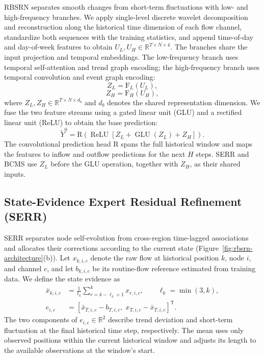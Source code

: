 RBSRN separates smooth changes from short-term fluctuations with low- and high-frequency branches. We apply single-level discrete wavelet decomposition and reconstruction along the historical time dimension of each flow channel, standardize both sequences with the training statistics, and append time-of-day and day-of-week features to obtain \(U_L,U_H\in\mathbb{R}^{T\times N\times4}\). The branches share the input projection and temporal embeddings. The low-frequency branch uses temporal self-attention and trend graph encoding; the high-frequency branch uses temporal convolution and event graph encoding:
\begin{equation}
\label{eq:low-frequency}
Z_L=\mathrm{F}_L(U_L),
\end{equation}
\begin{equation}
\label{eq:high-frequency}
Z_H=\mathrm{F}_H(U_H),
\end{equation}
where \(Z_L,Z_H\in\mathbb{R}^{T\times N\times d_b}\) and \(d_b\) denotes the shared representation dimension. We fuse the two feature streams using a gated linear unit (GLU) and a rectified linear unit (ReLU) to obtain the base prediction:
\begin{equation}
\label{eq:base-prediction}
\widetilde{Y}^{0}=\mathrm{R}\!\left(\operatorname{ReLU}\!\left[Z_L+\operatorname{GLU}(Z_L)+Z_H\right]\right).
\end{equation}
The convolutional prediction head \(\mathrm{R}\) spans the full historical window and maps the features to inflow and outflow predictions for the next \(H\) steps. SERR and BCMS use \(Z_L\) before the GLU operation, together with \(Z_H\), as their shared inputs.

\subsection{State-Evidence Expert Residual Refinement (SERR)}\label{sec:serr}

SERR separates node self-evolution from cross-region time-lagged associations and allocates their corrections according to the current state (Figure~\ref{fig:rbsrn-architecture}(b)). Let \(x_{k,i,c}\) denote the raw flow at historical position \(k\), node \(i\), and channel \(c\), and let \(b_{k,i,c}\) be its routine-flow reference estimated from training data. We define the state evidence as
\begin{equation}
\label{eq:state-evidence}
\begin{aligned}
\bar{x}_{k,i,c}&=\frac{1}{\ell_k}\sum_{r=k-\ell_k+1}^{k}x_{r,i,c},\qquad \ell_k=\min(3,k),\\
e_{i,c}&=\left[\bar{x}_{T,i,c}-b_{T,i,c},\;x_{T,i,c}-\bar{x}_{T,i,c}\right]^{\mathsf T}.
\end{aligned}
\end{equation}
The two components of \(e_{i,c}\in\mathbb{R}^{2}\) describe trend deviation and short-term fluctuation at the final historical time step, respectively. The mean uses only observed positions within the current historical window and adjusts its length to the available observations at the window's start.

